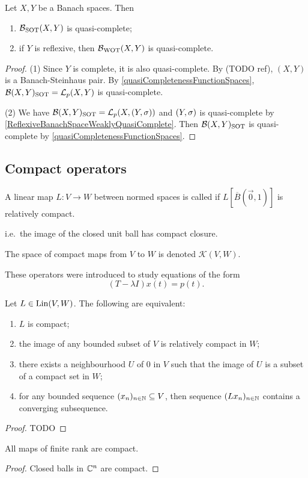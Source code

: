 \begin{proposition}
Let $X, Y$ be a Banach spaces. Then
\begin{enumerate}
\item $\operatorname{\mathcal{B}}_{\text{SOT}}(X,Y)$ is quasi-complete;
\item if $Y$ is reflexive, then $\operatorname{\mathcal{B}}_{\text{WOT}}(X,Y)$ is quasi-complete.
\end{enumerate}
\end{proposition}
\begin{proof}
(1) Since $Y$ is complete, it is also quasi-complete. By (TODO ref), $(X,Y)$ is a Banach-Steinhaus pair. By \ref{quasiCompletenessFunctionSpaces}, $\operatorname{\mathcal{B}}(X,Y)_\text{SOT} = \operatorname{\mathcal{L}}_p(X,Y)$ is quasi-complete.

(2) We have $\Bounded(X,Y)_\text{SOT} = \contLin_p(X,\sSet{Y,\sigma})$ and $\sSet{Y,\sigma}$ is quasi-complete by \ref{ReflexiveBanachSpaceWeaklyQuasiComplete}. Then $\operatorname{\mathcal{B}}(X,Y)_\text{SOT}$ is quasi-complete by \ref{quasiCompletenessFunctionSpaces}.
\end{proof}



\subsection{Compact operators}
\begin{definition}
A linear map $L:V\to W$ between normed spaces is called  if $L[\overline{B}(\vec{0}, 1)]$ is relatively compact.

i.e.\ the image of the closed unit ball has compact closure.

The space of compact maps from $V$ to $W$ is denoted $\mathcal{K}(V,W)$.
\end{definition}

These operators were introduced to study equations of the form
\[ (T-\lambda I)x(t) = p(t). \]

\begin{proposition}
Let $L\in\operatorname{Lin}(V,W)$. The following are equivalent:
\begin{enumerate}
\item $L$ is compact;
\item the image of any bounded subset of $V$ is relatively compact in $W$;
\item there exists a neighbourhood $U$ of $0$ in $V$ such that the image of $U$ is a subset of a compact set in $W$;
\item for any bounded sequence $(x_n)_{n\in\mathbb{N}} \subseteq V$, then sequence $(Lx_n)_{n\in\mathbb{N}}$ contains a converging subsequence.
\end{enumerate}
\end{proposition}
\begin{proof}
TODO
\end{proof}
\begin{corollary}
All maps of finite rank are compact.
\end{corollary}
\begin{proof}
Closed balls in $\mathbb{C}^n$ are compact.
\end{proof}

